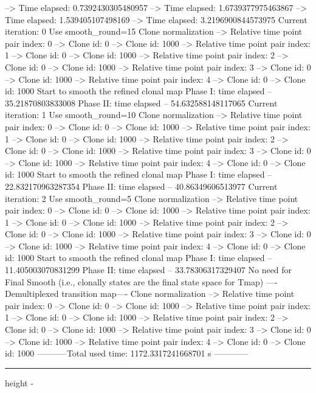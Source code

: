 \documentclass[letterpaper,10pt,english]{sphinxmanual}
\newlength\nbsphinxcodecellspacing
\begin{document}
{\begin{sphinxVerbatim}[commandchars=\\\{\}]
--> Time elapsed:  0.7392430305480957
--> Time elapsed:  1.6739377975463867
--> Time elapsed:  1.539405107498169
--> Time elapsed:  3.2196900844573975
Current iteration: 0
Use smooth\_round=15
Clone normalization
--> Relative time point pair index: 0
--> Clone id: 0
--> Clone id: 1000
--> Relative time point pair index: 1
--> Clone id: 0
--> Clone id: 1000
--> Relative time point pair index: 2
--> Clone id: 0
--> Clone id: 1000
--> Relative time point pair index: 3
--> Clone id: 0
--> Clone id: 1000
--> Relative time point pair index: 4
--> Clone id: 0
--> Clone id: 1000
Start to smooth the refined clonal map
Phase I: time elapsed --  35.21870803833008
Phase II: time elapsed --  54.632588148117065
Current iteration: 1
Use smooth\_round=10
Clone normalization
--> Relative time point pair index: 0
--> Clone id: 0
--> Clone id: 1000
--> Relative time point pair index: 1
--> Clone id: 0
--> Clone id: 1000
--> Relative time point pair index: 2
--> Clone id: 0
--> Clone id: 1000
--> Relative time point pair index: 3
--> Clone id: 0
--> Clone id: 1000
--> Relative time point pair index: 4
--> Clone id: 0
--> Clone id: 1000
Start to smooth the refined clonal map
Phase I: time elapsed --  22.832170963287354
Phase II: time elapsed --  40.86349606513977
Current iteration: 2
Use smooth\_round=5
Clone normalization
--> Relative time point pair index: 0
--> Clone id: 0
--> Clone id: 1000
--> Relative time point pair index: 1
--> Clone id: 0
--> Clone id: 1000
--> Relative time point pair index: 2
--> Clone id: 0
--> Clone id: 1000
--> Relative time point pair index: 3
--> Clone id: 0
--> Clone id: 1000
--> Relative time point pair index: 4
--> Clone id: 0
--> Clone id: 1000
Start to smooth the refined clonal map
Phase I: time elapsed --  11.405003070831299
Phase II: time elapsed --  33.78306317329407
No need for Final Smooth (i.e., clonally states are the final state space for Tmap)
----Demultiplexed transition map----
Clone normalization
--> Relative time point pair index: 0
--> Clone id: 0
--> Clone id: 1000
--> Relative time point pair index: 1
--> Clone id: 0
--> Clone id: 1000
--> Relative time point pair index: 2
--> Clone id: 0
--> Clone id: 1000
--> Relative time point pair index: 3
--> Clone id: 0
--> Clone id: 1000
--> Relative time point pair index: 4
--> Clone id: 0
--> Clone id: 1000
-----------Total used time: 1172.3317241668701 s ------------
\end{sphinxVerbatim}
}

\hrule height -\fboxrule\relax
\vspace{\nbsphinxcodecellspacing}
\end{document}
